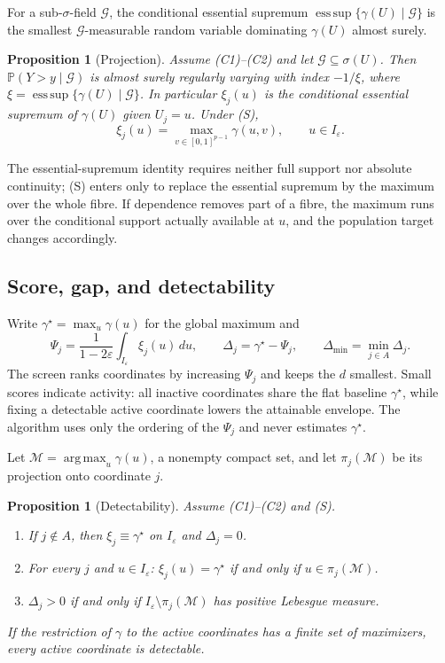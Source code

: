 \documentclass[bj,authoryear]{imsart}
\theoremstyle{plain}
\newtheorem{proposition}[theorem]{Proposition}
\DeclareMathOperator*{\esssup}{ess\,sup}
\DeclareMathOperator*{\argmax}{arg\,max}
\newcommand{\A}{A}\newcommand{\I}{I_\varepsilon}
\newcommand{\M}{\mathcal{M}}\newcommand{\Pp}{\mathbb P}
\newcommand{\gmax}{\gamma^\star}
\begin{document}
For a sub-$\sigma$-field $\mathcal G$, the conditional essential
supremum $\esssup\{\gamma(U)\mid\mathcal G\}$ is the smallest
$\mathcal G$-measurable random variable dominating $\gamma(U)$ almost
surely.

\begin{proposition}[Projection]\label{prop:projection}
Assume (C1)--(C2) and let $\mathcal G\subseteq\sigma(U)$. Then
$\Pp(Y>y\mid\mathcal G)$ is almost surely regularly varying with index
$-1/\xi$, where $\xi=\esssup\{\gamma(U)\mid\mathcal G\}$. In particular
$\xi_j(u)$ is the conditional essential supremum of $\gamma(U)$ given
$U_j=u$. Under (S),
\begin{equation}\label{eq:fibre}
 \xi_j(u)=\max_{v\in[0,1]^{p-1}}\gamma(u,v),\qquad u\in\I.
\end{equation}
\end{proposition}

The essential-supremum identity requires neither full support nor absolute
continuity; (S) enters only to replace the essential supremum by the
maximum over the whole fibre. If dependence removes part of a fibre, the
maximum runs over the conditional support actually available at $u$, and
the population target changes accordingly.

\subsection{Score, gap, and detectability}

Write $\gmax=\max_u\gamma(u)$ for the global maximum and
\begin{equation}\label{eq:score}
 \Psi_j=\frac{1}{1-2\varepsilon}\int_{\I}\xi_j(u)\,du,
 \qquad
 \Delta_j=\gmax-\Psi_j,
 \qquad
 \Delta_{\min}=\min_{j\in\A}\Delta_j.
\end{equation}
The screen ranks coordinates by increasing $\Psi_j$ and keeps the $d$
smallest. Small scores indicate activity: all inactive coordinates share the
flat baseline $\gmax$, while fixing a detectable active coordinate lowers
the attainable envelope. The algorithm uses only the ordering of the
$\Psi_j$ and never estimates $\gmax$.

Let $\M=\argmax_u\gamma(u)$, a nonempty compact set, and let $\pi_j(\M)$ be
its projection onto coordinate $j$.

\begin{proposition}[Detectability]\label{prop:geometry}
Assume (C1)--(C2) and (S).
\begin{enumerate}
\item If $j\notin\A$, then $\xi_j\equiv\gmax$ on $\I$ and $\Delta_j=0$.
\item For every $j$ and $u\in\I$: $\xi_j(u)=\gmax$ if and only if
$u\in\pi_j(\M)$.
\item $\Delta_j>0$ if and only if $\I\setminus\pi_j(\M)$ has positive
Lebesgue measure.
\end{enumerate}
If the restriction of $\gamma$ to the active coordinates has a finite set
of maximizers, every active coordinate is detectable.
\end{proposition}
\end{document}
